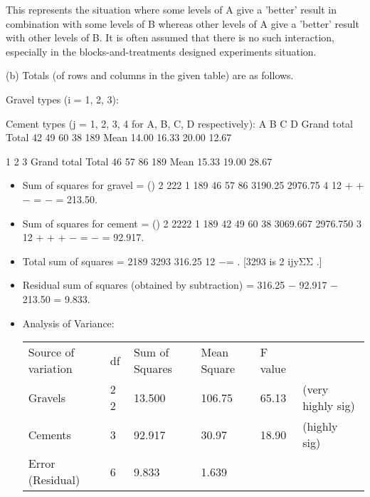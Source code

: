 \documentclass[a4paper,12pt]{article}
\begin{document}
\begin{enumerate}
\begin{itemize}
  
  This represents the situation where some levels of A give a 'better' result in combination with some levels of B whereas other levels of A give a 'better' result with other levels of B.  It is often assumed that there is no such interaction, especially in the blocks-and-treatments designed experiments situation. 
\end{itemize} 
 
(b) Totals (of rows and columns in the given table) are as follows. 
 
Gravel types (i = 1, 2, 3): 
 
 
 
Cement types (j = 1, 2, 3, 4 for A, B, C, D respectively): 
  A B C D Grand total Total 42 49 60 38 189 Mean 14.00 16.33 20.00 12.67  
 
 1 2 3 Grand total Total 46 57 86 189 Mean 15.33 19.00 28.67  


\begin{itemize}
    \item Sum of squares for gravel = () 2 222 1 189 46 57 86 3190.25 2976.75 4 12 + + − = −  = 213.50. 
    \item Sum of squares for cement = () 2 2222 1 189 42 49 60 38 3069.667 2976.750 3 12 + + + − = − = 92.917. 
    \item Total sum of squares = 2189 3293 316.25 12 −= .        [3293 is 2 ijyΣΣ .] 
\item  
Residual sum of squares (obtained by subtraction) = 316.25 − 92.917 − 213.50 = 9.833. 
 
\item Analysis of Variance: 

\begin{center}
    \begin{tabular}{|l|l|l|l|l|l|}
Source of variation & df & Sum of Squares & Mean Square &  F value & \\
Gravels                                                   & 2 2 & 13.500 & 106.75 & 65.13 & (very highly sig)   \\
Cements                                                   & 3                      & 92.917            & 30.97 & 18.90 & (highly sig)   \\
Error (Residual)                                          & 6                      & 9.833             & 1.639       &              & 
\end{tabular}
\end{center}  


\end{itemize}
\end{enumerate}
\end{document}
